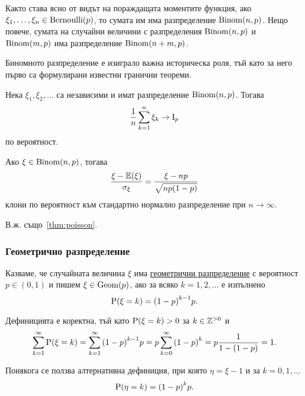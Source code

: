 \documentclass[numbers=endperiod, DIV=15, bibliography=totocnumbered]{scrartcl}
\begin{document}
Както става ясно от видът на пораждащата моментите функция, ако $\xi_1, \ldots, \xi_n \in \operatorname{Bernoulli}(p)$, то сумата им има разпределение $\operatorname{Binom}(n, p)$. Нещо повече, сумата на случайни величини с разпределения $\operatorname{Binom}(n, p)$ и $\operatorname{Binom}(m, p)$ има разпределение $\operatorname{Binom}(n + m, p)$.

Биномното разпределение е изиграло важна историческа роля, тъй като за него първо са формулирани известни гранични теореми.

\begin{theorem}\label{thm:bernoulli}
  Нека $\xi_1, \xi_2, \ldots$ са независими и имат разпределение $\operatorname{Binom}(n, p)$. Тогава
  \begin{displaymath}
    \frac 1 n \sum_{k=1}^n \xi_k
    \to
    \operatorname{I}_p
  \end{displaymath}
  по вероятност.
\end{theorem}

\begin{theorem}\label{thm:moivre-laplace}
  Ако $\xi \in \operatorname{Binom}(n, p)$, тогава
  \begin{displaymath}
    \frac {\xi - \mathbb{E}(\xi)} {\sigma_\xi}
    =
    \frac {\xi - np} {\sqrt{np(1-p)}}
  \end{displaymath}
  клони по вероятност към стандартно нормално разпределение при $n \to \infty$.
\end{theorem}

В.ж. също~\ref{thm:poisson}.

\subsubsection{Геометрично разпределение}\label{dist:geom}

\begin{definition}
  Казваме, че случайната величина $\xi$ има \uline{геометрични разпределение} с вероятност $p \in (0, 1)$ и пишем $\xi \in \operatorname{Geom}(p)$, ако за всяко $k = 1, 2, \ldots$ е изпълнено
  \begin{displaymath}
    \operatorname{P}(\xi = k) = {(1-p)}^{k-1} p.
  \end{displaymath}

  Дефиницията е коректна, тъй като $\operatorname{P}(\xi = k) > 0$ за $k \in \mathbb{Z}^{> 0}$ и
  \begin{displaymath}
    \sum_{k=1}^\infty \operatorname{P}(\xi = k)
    =
    \sum_{k=1}^\infty {(1-p)}^{k-1} p
    =
    p \sum_{k=0}^\infty {(1-p)}^k
    =
    p \frac 1 {1-(1-p)}
    =
    1.
  \end{displaymath}

  Понякога се ползва алтернативна дефиниция, при която $\eta = \xi - 1$ и за $k = 0, 1, \ldots$
  \begin{displaymath}
    \operatorname{P}(\eta = k) = {(1-p)}^k p.
  \end{displaymath}
\end{definition}
\end{document}
